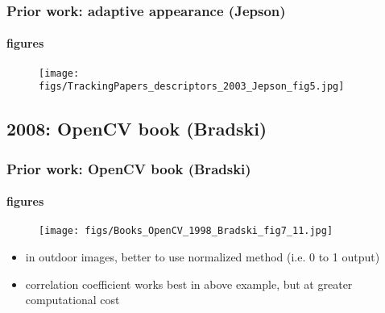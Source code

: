 \begin{frame}
\frametitle{Prior work: adaptive appearance (Jepson)}
\framesubtitle{figures}
\mypagenum
{}
	\begin{figure}
		\texttt{[image: figs/TrackingPapers\_descriptors\_2003\_Jepson\_fig5.jpg]}
	\end{figure}
\end{frame}







\subsection{2008: OpenCV book (Bradski)}
\begin{frame}
\frametitle{Prior work: OpenCV book (Bradski)}
\framesubtitle{figures}
\mypagenum
{}
	\begin{figure}
		\texttt{[image: figs/Books\_OpenCV\_1998\_Bradski\_fig7\_11.jpg]}
	\end{figure}
	\begin{itemize}
		\item in outdoor images, better to use normalized method (i.e. 0 to 1 output)
		\item correlation coefficient works best in above example, but at greater computational cost
	\end{itemize}
\end{frame}


\printbibliography

